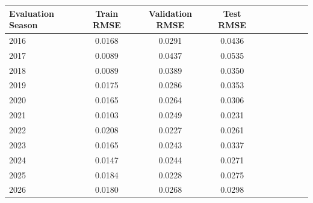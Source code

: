 \begin{tabular}{lccccccccc}
\toprule
Evaluation Season & Train RMSE & Validation RMSE & Test RMSE \\
\midrule
2016 & 0.0168 & 0.0291 & 0.0436 \\
2017 & 0.0089 & 0.0437 & 0.0535 \\
2018 & 0.0089 & 0.0389 & 0.0350 \\
2019 & 0.0175 & 0.0286 & 0.0353 \\
2020 & 0.0165 & 0.0264 & 0.0306 \\
2021 & 0.0103 & 0.0249 & 0.0231 \\
2022 & 0.0208 & 0.0227 & 0.0261 \\
2023 & 0.0165 & 0.0243 & 0.0337 \\
2024 & 0.0147 & 0.0244 & 0.0271 \\
2025 & 0.0184 & 0.0228 & 0.0275 \\
2026 & 0.0180 & 0.0268 & 0.0298 \\
\bottomrule
\end{tabular}
